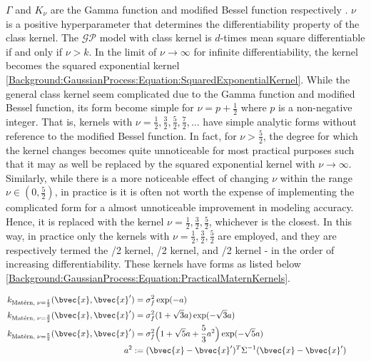 				$\Gamma$ and $K_{\nu}$ are the Gamma function and modified Bessel function respectively \citep{GaussianProcessForMachineLearning}. $\nu$ is a positive hyperparameter that determines the differentiability property of the \matern class kernel. The $\mathcal{GP}$ model with \matern class kernel is $d$-times mean square differentiable if and only if $\nu > k$. In the limit of $\nu \rightarrow \infty$ for infinite differentiability, the \matern kernel becomes the squared exponential kernel \eqref{Background:GaussianProcess:Equation:SquaredExponentialKernel}. While the general \matern class kernel seem complicated due to the Gamma function and modified Bessel function, its form become simple for $\nu = p + \frac{1}{2}$ where $p$ is a non-negative integer. That is, \matern kernels with $\nu = \frac{1}{2}, \frac{3}{2}, \frac{5}{2}, \frac{7}{2}, \dots$ have simple analytic forms without reference to the modified Bessel function. In fact, for $\nu > \frac{5}{2}$, the degree for which the \matern kernel changes becomes quite unnoticeable for most practical purposes such that it may as well be replaced by the squared exponential kernel with $\nu \rightarrow \infty$. Similarly, while there is a more noticeable effect of changing $\nu$ within the range $\nu \in (0, \frac{5}{2})$, in practice is it is often not worth the expense of implementing the complicated form for a almost unnoticeable improvement in modeling accuracy. Hence, it is replaced with the \matern kernel $\nu = \frac{1}{2}, \frac{3}{2}, \frac{5}{2}$, whichever is the closest. In this way, in practice only the \matern kernels with $\nu = \frac{1}{2}, \frac{3}{2}, \frac{5}{2}$ are employed, and they are respectively termed the /2 kernel, /2 kernel, and /2 kernel - in the order of increasing differentiability. These kernels have forms as listed below \eqref{Background:GaussianProcess:Equation:PracticalMaternKernels}.
				
				\begin{equation}
					\left.
						\begin{aligned}
							k_{\mathrm{\maternmath}, \; \nu = \frac{1}{2}}(\bvec{x}, \bvec{x}') =& \; \sigma_{f}^{2} \exp ( -a ) \\
							k_{\mathrm{\maternmath}, \; \nu = \frac{3}{2}}(\bvec{x}, \bvec{x}') =& \; \sigma_{f}^{2} (1 + \sqrt{3} a) \exp ( -\sqrt{3} a ) \\
							k_{\mathrm{\maternmath}, \; \nu = \frac{5}{2}}(\bvec{x}, \bvec{x}') =& \; \sigma_{f}^{2} \Big(1 + \sqrt{5} a + \frac{5}{3} a^{2}\Big) \exp ( -\sqrt{5} a )  \\
							a^{2} :=& \; (\bvec{x} - \bvec{x}')^{T} \Sigma^{-1} (\bvec{x} - \bvec{x}')
						\end{aligned}
					\qquad \right.
				\label{Background:GaussianProcess:Equation:PracticalMaternKernels}
				\end{equation}			
				
